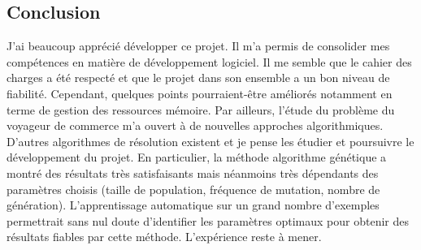 \documentclass[11pt]{article}
\begin{document}
\subsection*{Conclusion}

J'ai beaucoup apprécié développer ce projet. Il m'a permis de consolider mes compétences en matière de développement logiciel. Il me semble que le cahier des charges a été respecté et que le projet dans son ensemble a un bon niveau de fiabilité. Cependant, quelques points pourraient-être améliorés notamment en terme de gestion des ressources mémoire. Par ailleurs, l'étude du problème du voyageur de commerce m'a ouvert à de nouvelles approches algorithmiques. D'autres algorithmes de résolution existent et je pense les étudier et poursuivre le développement du projet. En particulier, la méthode algorithme génétique a montré des résultats très satisfaisants mais néanmoins très dépendants des paramètres choisis (taille de population, fréquence de mutation, nombre de génération). L'apprentissage automatique sur un grand nombre d'exemples permettrait sans nul doute d'identifier les paramètres optimaux pour obtenir des résultats fiables par cette méthode. L'expérience reste à mener.
\end{document}
